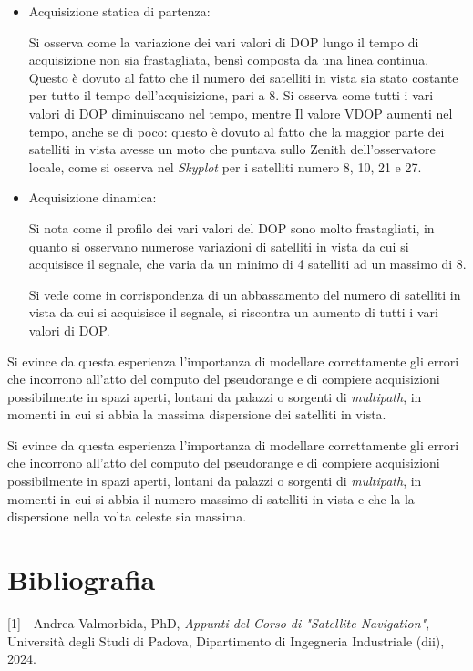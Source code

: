\documentclass[a4paper,11pt,twoside]{book}
\begin{document}
	\begin{itemize}[-]
		\item Acquisizione statica di partenza:
		
		Si osserva come la variazione dei vari valori di DOP lungo il tempo di acquisizione non sia frastagliata, bensì composta da una linea continua. Questo è dovuto al fatto che il numero dei satelliti in vista sia stato costante per tutto il tempo dell'acquisizione, pari a 8. Si osserva come tutti i vari valori di DOP diminuiscano nel tempo, mentre Il valore VDOP aumenti nel tempo, anche se di poco: questo è dovuto al fatto che la maggior parte dei satelliti in vista avesse un moto che puntava sullo Zenith dell'osservatore locale, come si osserva nel \textit{Skyplot} per i satelliti numero 8, 10, 21 e 27.
		
		\item Acquisizione dinamica:
		
		Si nota come il profilo dei vari valori del DOP sono molto frastagliati, in quanto si osservano numerose variazioni di satelliti in vista da cui si acquisisce il segnale, che varia da un minimo di 4 satelliti ad un massimo di 8.
		
		Si vede come in corrispondenza di un abbassamento del numero di satelliti in vista da cui si acquisisce il segnale, si riscontra un aumento di tutti i vari valori di DOP.
	\end{itemize}
	
	Si evince da questa esperienza l'importanza di modellare correttamente gli errori che incorrono all'atto del computo del pseudorange e di compiere acquisizioni possibilmente in spazi aperti, lontani da palazzi o sorgenti di \textit{multipath}, in momenti in cui si abbia la massima dispersione dei satelliti in vista.
	
	
	Si evince da questa esperienza l'importanza di modellare correttamente gli errori che incorrono all'atto del computo del pseudorange e di compiere acquisizioni possibilmente in spazi aperti, lontani da palazzi o sorgenti di \textit{multipath}, in momenti in cui si abbia il numero massimo di satelliti in vista e che la la dispersione nella volta celeste sia massima.
	
	\section{Bibliografia}
	
	[1] - Andrea Valmorbida, PhD, \textit{Appunti del Corso di "Satellite Navigation"}, Università degli Studi di Padova, Dipartimento di Ingegneria Industriale (dii), 2024.
	
\end{document}
